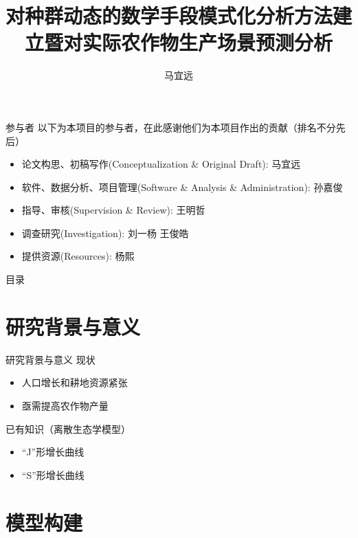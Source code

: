 \documentclass[aspectratio=169, compress]{ctexbeamer}
\title{对种群动态的数学手段模式化分析方法建立暨对实际农作物生产场景预测分析}
\author{马宜远}
\institute{大连市第二十四中学}
\date{}
\begin{document}
\begin{frame}
    \titlepage
\end{frame}

\begin{frame}{参与者}
    以下为本项目的参与者，在此感谢他们为本项目作出的贡献（排名不分先后）
    \begin{itemize}
        \item 论文构思、初稿写作(Conceptualization \& Original Draft): 马宜远
        \item 软件、数据分析、项目管理(Software \& Analysis \& Administration): 孙嘉俊
        \item 指导、审核(Supervision \& Review): 王明哲
        \item 调查研究(Investigation): 刘一杨 \space 王俊皓
        \item 提供资源(Resources): 杨熙
    \end{itemize}
\end{frame}

\begin{frame}{目录}
    \tableofcontents
\end{frame}

\section{研究背景与意义}

\begin{frame}{研究背景与意义}
    现状
    \begin{itemize}
        \item 人口增长和耕地资源紧张
        \item 亟需提高农作物产量
    \end{itemize}
    \vspace{1em}
    \pause

    已有知识（离散生态学模型）
    \begin{itemize}
        \item “J”形增长曲线
        \item “S”形增长曲线
    \end{itemize}
    \pause
    \vspace{1em}
\end{frame}

\section{模型构建}
\end{document}
